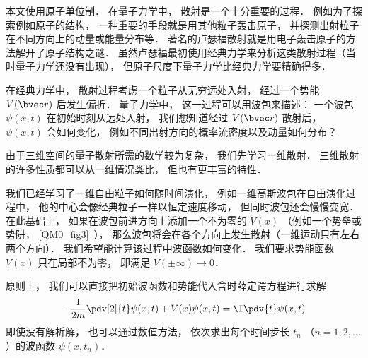 
\begin{issues}
\issueTODO
\end{issues}


本文使用原子单位制． 在量子力学中， 散射是一个十分重要的过程． 例如为了探索例如原子的结构， 一种重要的手段就是用其他粒子轰击原子， 并探测出射粒子在不同方向上的动量或能量分布等． 著名的卢瑟福散射就是用电子轰击原子的方法解开了原子结构之谜． 虽然卢瑟福最初使用经典力学来分析这类散射过程（当时量子力学还没有出现）， 但原子尺度下量子力学比经典力学要精确得多．

在经典力学中， 散射过程考虑一个粒子从无穷远处入射， 经过一个势能 $V(\bvec r)$ 后发生偏折． 量子力学中， 这一过程可以用波包来描述： 一个波包 $\psi(x, t)$ 在初始时刻从远处入射， 我们想知道经过 $V(\bvec r)$ 散射后， $\psi(x, t)$ 会如何变化， 例如不同出射方向的概率流密度以及动量如何分布？

由于三维空间的量子散射所需的数学较为复杂， 我们先学习一维散射． 三维散射的许多性质都可以从一维情况类比， 但也有更丰富的特性．

我们已经学习了一维自由粒子如何随时间演化， 例如一维高斯波包在自由演化过程中， 他的中心会像经典粒子一样以恒定速度移动， 但同时波包还会慢慢变宽． 在此基础上， 如果在波包前进方向上添加一个不为零的 $V(x)$ （例如一个势垒或势阱， \autoref{QM0_fig3}~）， 那么波包将会在各个方向上发生散射（一维运动只有左右两个方向）． 我们希望能计算该过程中波函数如何变化． 我们要求势能函数 $V(x)$ 只在局部不为零， 即满足 $V(\pm\infty) \to 0$． 

原则上， 我们可以直接把初始波函数和势能代入含时薛定谔方程进行求解
\begin{equation}\label{Sca1D_eq1}
-\frac{1}{2m}\pdv[2]{t}\psi(x, t) + V(x) \psi(x, t) = \I \pdv{t} \psi(x, t)
\end{equation}
即使没有解析解， 也可以通过数值方法， 依次求出每个时间步长 $t_n$ （$n = 1, 2, \dots$）的波函数 $\psi(x, t_n)$．

